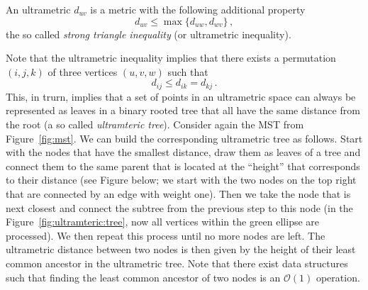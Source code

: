 \begin{definition*}
  An ultrametric $d_{uv}$ is a metric with the following additional
  property
  \begin{equation*}
    d_{uv} \le \max\{ d_{uw}, d_{wv}\}\,,
  \end{equation*}
  the so called \emph{strong triangle inequality} (or ultrametric
  inequality).
\end{definition*}
Note that the ultrametric inequality implies that there exists a
permutation $(i,j,k)$ of three vertices $(u,v,w)$ such that
\begin{equation*}
  d_{ij} \le d_{ik} = d_{kj}\,.
\end{equation*}
This, in trurn, implies that a set of points in an ultrametric space
can always be represented as leaves in a binary rooted tree that all
have the same distance from the root (a so called \emph{ultramteric
  tree}). Consider again the MST from Figure~\ref{fig:mst}. We can
build the corresponding ultrametric tree as follows. Start with the
nodes that have the smallest distance, draw them as leaves of a tree
and connect them to the same parent that is located at the ``height''
that corresponds to their distance (see Figure below; we start with
the two nodes on the top right that are connected by an edge with
weight one). Then we take the node that is next closest and connect
the subtree from the previous step to this node (in the
Figure~\ref{fig:ultramteric:tree}, now all vertices within the green
ellipse are processed). We then repeat this process until no more
nodes are left. The ultrametric distance between two nodes is then
given by the height of their least common ancestor in the ultrametric
tree. Note that there exist data structures such that finding the
least common ancestor of two nodes is an $\mathcal{O}(1)$ operation.


